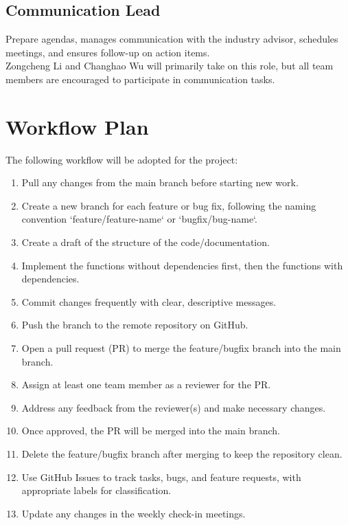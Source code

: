 \documentclass{article}
\begin{document}
\subsection*{Communication Lead}
Prepare agendas, manages communication with the industry advisor, schedules meetings, and ensures follow-up on action items. \\
Zongcheng Li and Changhao Wu will primarily take on this role, but all team members are encouraged to participate in communication tasks.

\section{Workflow Plan}

The following workflow will be adopted for the project:
\begin{enumerate}
  \item Pull any changes from the main branch before starting new work.
	\item Create a new branch for each feature or bug fix, following the naming convention `feature/feature-name` or `bugfix/bug-name`.
	\item Create a draft of the structure of the code/documentation.
	\item Implement the functions without dependencies first, then the functions with dependencies.
	\item Commit changes frequently with clear, descriptive messages.
	\item Push the branch to the remote repository on GitHub.
	\item Open a pull request (PR) to merge the feature/bugfix branch into the main branch.
	\item Assign at least one team member as a reviewer for the PR.
	\item Address any feedback from the reviewer(s) and make necessary changes.
	\item Once approved, the PR will be merged into the main branch.
	\item Delete the feature/bugfix branch after merging to keep the repository clean.
	\item Use GitHub Issues to track tasks, bugs, and feature requests, with appropriate labels for classification.
	\item Update any changes in the weekly check-in meetings.
\end{enumerate}
\end{document}
